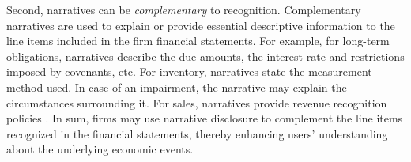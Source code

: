 \documentclass[letterpaper,12pt]{article}
\begin{document}
\begin{spacing}{1.5}
Second, narratives can be \textit{complementary} to recognition. Complementary narratives are used to explain or provide essential descriptive information to the line items included in the firm financial statements. For example, for long-term obligations, narratives describe the due amounts, the interest rate and restrictions imposed by covenants, etc. For inventory, narratives state the measurement method used. In case of an impairment, the narrative may explain the circumstances surrounding it. For sales, narratives provide revenue recognition policies \cite[footnote 4, CON5-7]{fasbStatementFinancialAccounting1984}. In sum, firms may use narrative disclosure to complement the line items recognized in the financial statements, thereby enhancing users' understanding about the underlying economic events.

\begin{comment}
	\citeA[footnote 4, CON5-7]{fasbStatementFinancialAccounting1984} gives several examples on the complementary role of notes to financial statements:
	
	\begin{adjustwidth}{1cm}{1cm}
	\begin{singlespace}
	\indent \textit{For example, notes provide essential descriptive information for long-term obligations, including when amounts are due, what interest they bear, and whether important restrictions are imposed by related covenants. For inventory, the notes provide information on the measurement method used---FIFO cost, LIFO cost, current market value, etc. For an estimated litigation liability, an extended discussion of the circumstances, counsel's opinions, and the basis for management's judgment may all be provided in the notes. For sales, useful information about revenue recognition policies may appear only in the notes (FASB Statement No. 47, Disclosure of Long-Term Obligations; ARB No. 43, Chapter 4, ``Inventory Pricing", statement 8; FASB Statement No. 5, Accounting for Contingencies, par. 10; and APB Statement 4, par. 199)}.
	\end{singlespace}
	\end{adjustwidth}
\end{comment}


\end{spacing}
\end{document}
